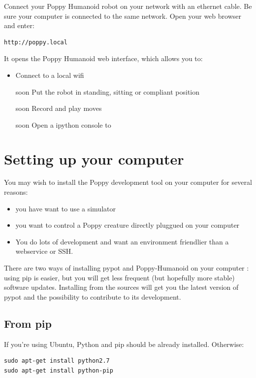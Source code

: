 \documentclass{article}
\begin{document}
Connect your Poppy Humanoid robot on your network with an ethernet cable. Be sure your computer is connected to the same network. Open your web browser and enter:

\begin{verbatim}
http://poppy.local
\end{verbatim}

It opens the Poppy Humanoid web interface, which allows you to:

\begin{itemize}
\item Connect to a local wifi
\item [soon] Put the robot in standing, sitting or compliant position
\item [soon] Record and play moves
\item [soon] Open a ipython console to 
\end{itemize}


\section{Setting up your computer}
\label{installing-pypot}
You may wish to install the Poppy development tool on your computer for several reasons:

\begin{itemize}
\item you have want to use a simulator
\item you want to control a Poppy creature directly pluggued on your computer
\item You do lots of development and want an environment friendlier than a webservice or SSH.
\end{itemize}


There are two ways of installing pypot and Poppy-Humanoid on your computer : using pip is easier, but you will get less frequent (but hopefully more stable) software updates. Installing from the sources will get you the latest version of pypot and the possibility to contribute to its development.

\subsection{From pip}
If you're using Ubuntu, Python and pip should be already installed. Otherwise:
\begin{verbatim}
sudo apt-get install python2.7
sudo apt-get install python-pip
\end{verbatim}
\end{document}
